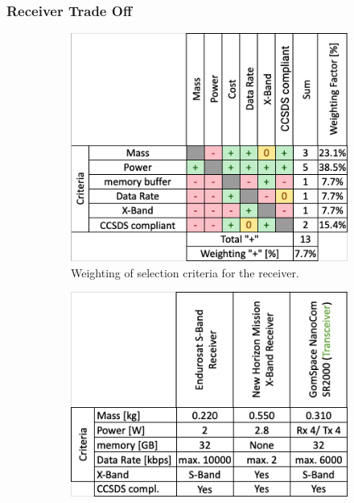 \subsubsection{Receiver Trade Off}
\begin{figure}[h]
     \centering
     \begin{subfigure}[b]{0.49\textwidth}
         \centering
         \includegraphics[width=\textwidth]{Media/Trade_off/Receiver/Weighting_Rec.png}
         \caption{Weighting of selection criteria for the receiver.}
         \label{fig:Weighting_Rec}
     \end{subfigure}
     \hfill
     \begin{subfigure}[b]{0.49\textwidth}
         \centering
         \includegraphics[width=\textwidth]{Media/Trade_off/Receiver/Values_Rec.png}

\end{subfigure}
\end{figure}
